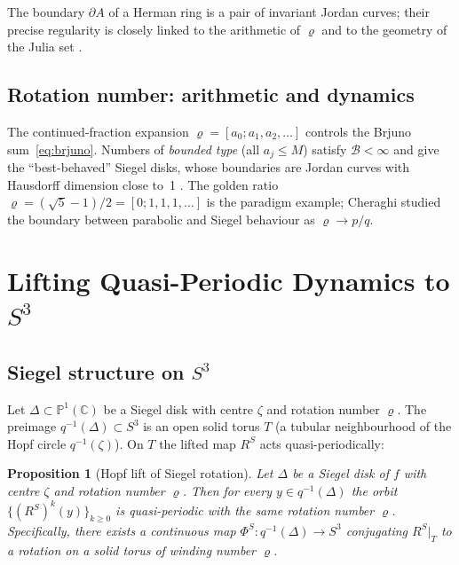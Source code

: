 \documentclass[12pt,a4paper]{article}
\newtheorem{proposition}[theorem]{Proposition}
\newcommand{\Pone}{\mathbb{P}^1(\mathbb{C})}
\newcommand{\Sthree}{S^3}
\newcommand{\RS}{R^S}         %
\newcommand{\rot}{\varrho}    %
\newcommand{\qmap}{q}         %
\begin{document}
The boundary $\partial A$ of a Herman ring is a pair of invariant Jordan
curves; their precise regularity is closely linked to the arithmetic of
$\rot$ and to the geometry of the Julia set \cite{McMullen1998}.

\subsection{Rotation number: arithmetic and dynamics}
\label{ssec:rot_arith}

The continued-fraction expansion $\rot = [a_0; a_1, a_2, \ldots]$ controls
the Brjuno sum~\eqref{eq:brjuno}.
Numbers of \emph{bounded type} (all $a_j \le M$) satisfy $\mathcal{B}<\infty$
and give the ``best-behaved'' Siegel disks, whose boundaries are Jordan
curves with Hausdorff dimension close to~1 \cite{McMullen1998}.
The golden ratio $\rot = (\sqrt{5}-1)/2 = [0;1,1,1,\ldots]$ is the paradigm
example; Cheraghi \cite{Cheraghi2013} studied the boundary between parabolic
and Siegel behaviour as $\rot\to p/q$.

\section{Lifting Quasi-Periodic Dynamics to \texorpdfstring{$S^3$}{S3}}
\label{sec:lift}

\subsection{Siegel structure on $S^3$}
\label{ssec:siegel_s3}

Let $\Delta\subset\Pone$ be a Siegel disk with centre $\zeta$ and rotation
number $\rot$.
The preimage $\qmap^{-1}(\Delta)\subset\Sthree$ is an open solid torus $T$
(a tubular neighbourhood of the Hopf circle $\qmap^{-1}(\zeta)$).
On $T$ the lifted map $\RS$ acts quasi-periodically:

\begin{proposition}[Hopf lift of Siegel rotation]
\label{prop:siegel_hopf}
Let $\Delta$ be a Siegel disk of $f$ with centre $\zeta$ and rotation
number $\rot$.
Then for every $y\in\qmap^{-1}(\Delta)$ the orbit $\{(\RS)^k(y)\}_{k\ge 0}$
is quasi-periodic with the same rotation number $\rot$.
Specifically, there exists a continuous map
$\Phi^S\colon\qmap^{-1}(\Delta)\to\Sthree$
conjugating $\RS|_T$ to a rotation on a solid torus of winding number $\rot$.
\end{proposition}
\end{document}
